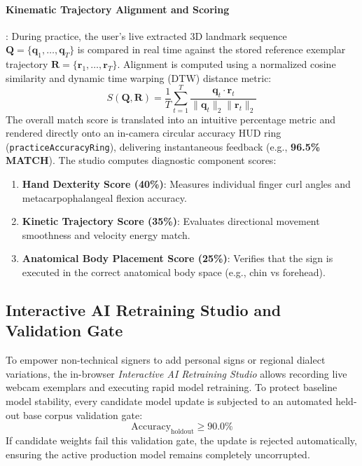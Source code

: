 \paragraph{Kinematic Trajectory Alignment and Scoring}:
During practice, the user's live extracted 3D landmark sequence $\mathbf{Q} = \{\mathbf{q}_1, \dots, \mathbf{q}_T\}$ is compared in real time against the stored reference exemplar trajectory $\mathbf{R} = \{\mathbf{r}_1, \dots, \mathbf{r}_T\}$. Alignment is computed using a normalized cosine similarity and dynamic time warping (DTW) distance metric:
\begin{equation}
    S(\mathbf{Q}, \mathbf{R}) = \frac{1}{T} \sum_{t=1}^T \frac{\mathbf{q}_t \cdot \mathbf{r}_t}{\|\mathbf{q}_t\|_2 \|\mathbf{r}_t\|_2}
\end{equation}
The overall match score is translated into an intuitive percentage metric and rendered directly onto an in-camera circular accuracy HUD ring (\texttt{practiceAccuracyRing}), delivering instantaneous feedback (e.g., \textbf{96.5\% MATCH}). The studio computes diagnostic component scores:
\begin{enumerate}
    \item \textbf{Hand Dexterity Score (40\%)}: Measures individual finger curl angles and metacarpophalangeal flexion accuracy.
    \item \textbf{Kinetic Trajectory Score (35\%)}: Evaluates directional movement smoothness and velocity energy match.
    \item \textbf{Anatomical Body Placement Score (25\%)}: Verifies that the sign is executed in the correct anatomical body space (e.g., chin vs forehead).
\end{enumerate}


\subsection{Interactive AI Retraining Studio and Validation Gate}
To empower non-technical signers to add personal signs or regional dialect variations, the in-browser \textit{Interactive AI Retraining Studio} allows recording live webcam exemplars and executing rapid model retraining. To protect baseline model stability, every candidate model update is subjected to an automated held-out base corpus validation gate:
\begin{equation}
    \text{Accuracy}_{\text{holdout}} \ge 90.0\%
\end{equation}
If candidate weights fail this validation gate, the update is rejected automatically, ensuring the active production model remains completely uncorrupted.

